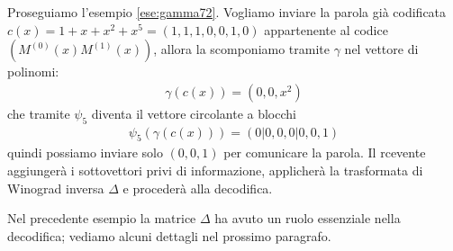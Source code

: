 \begin{esempio}
   Proseguiamo l'esempio \ref{ese:gamma72}. Vogliamo inviare la parola già codificata $c(x) = 1 + x + x^2 + x^5 = (1,1,1,0,0,1,0)$ appartenente al codice $(M^{(0)}(x)M^{(1)}(x))$, allora la scomponiamo tramite $\gamma$ nel vettore di polinomi:
   \begin{align*}
      \gamma(c(x)) = (0,0,x^2)
   \end{align*}
   che tramite $\psi_{5}$ diventa il vettore circolante a blocchi 
   \begin{align*}
      \psi_{5}(\gamma(c(x))) = (0|0,0,0|0,0,1)
   \end{align*}
   quindi possiamo inviare solo $(0,0,1)$ per comunicare la parola. Il rcevente aggiungerà i sottovettori privi di informazione, applicherà la trasformata di Winograd inversa $\Delta$ e procederà alla decodifica.
\end{esempio}
Nel precedente esempio la matrice $\Delta$ ha avuto un ruolo essenziale nella decodifica; vediamo alcuni dettagli nel prossimo paragrafo.  

